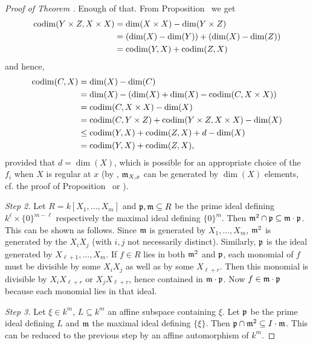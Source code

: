 \documentclass[a4paper,parskip=half,numbers=enddot, DIV=12]{scrreprt}
\begin{document}
\begin{proof}[Proof of Theorem ]
    Enough of that. From Proposition~ we get
    \begin{align*}
    	\operatorname{codim}(Y\times Z,X\times X)&=\dim(X\times X)-\dim(Y\times Z)\\
    	&=(\dim (X)-\dim (Y))+(\dim (X)-\dim (Z))\\
    	&=\operatorname{codim}(Y,X)+\operatorname{codim}(Z,X)
    \end{align*}
    and hence, 
    \begin{align*}
        \operatorname{codim}(C,X)& = \dim(X) -\dim(C)\\
        &= \dim (X) - (\dim(X)+\dim(X) -\operatorname{codim}(C,X\times X))\\
        &= \operatorname{codim}(C,X\times X) -\dim (X)\\
        &=\operatorname{codim}(C,Y\times Z)+\operatorname{codim}(Y\times Z,X\times X)-\dim (X)\\
        &\leq \operatorname{codim}(Y,X) +\operatorname{codim}(Z,X) +d-\dim(X) \\
        &=\operatorname{codim}(Y,X) +\operatorname{codim}(Z,X),
    \end{align*}
    provided that $d=\dim(X)$, which is possible for an appropriate choice of the $f_i$ when $X$ is regular at $x$ (by \NAK, $\mathfrak{m}_{X,x}$ can be generated by $\dim (X)$ elements, cf. the proof of Proposition~ or \cite[Concluding remarks, Lemma~1]{alg1}).
    
    \emph{Step 2.} Let $R= k[X_1,\ldots, X_m]$ and $\mathfrak{p},\mathfrak{m}\subseteq R$ be the prime ideal defining $k^\ell \times \{0\}^{m-\ell}$ respectively the maximal ideal defining $\{0\}^m$. Then $\mathfrak{m}^2 \cap \mathfrak{p} \subseteq \mathfrak{m}\cdot\mathfrak{p}$. This can be shown as follows. Since $\mathfrak{m}$ is generated by $X_1,\ldots,X_m$, $\mathfrak{m}^2$ is generated by the $X_iX_j$ (with $i,j$ not necessarily distinct). Similarly, $\mathfrak{p}$ is the ideal generated by $X_{\ell+1},\ldots, X_m$. If $f\in R$ lies in both $\mathfrak{m}^2$ and $\mathfrak{p}$, each monomial of $f$ must be divisible by some $X_iX_j$ as well as by some $X_{\ell+r}$. Then this monomial is divisible by $X_iX_{\ell+r}$ or $X_jX_{\ell+r}$, hence contained in $\mathfrak{m}\cdot\mathfrak{p}$. Now $f\in\mathfrak{m}\cdot\mathfrak{p}$ because each monomial lies in that ideal.
       
   \emph{Step 3.} Let $\xi\in k^m$, $L\subseteq k^m$ an affine subspace containing $\xi$. Let $\mathfrak{p}$ be the prime ideal defining $L$ and $\mathfrak{m}$ the maximal ideal defining $\{\xi\}$. Then $\mathfrak{p}\cap \mathfrak{m}^2 \subseteq I\cdot \mathfrak{m}$. This can be reduced to the previous step by an affine automorphism of $k^m$.
    

\end{proof}
\end{document}
